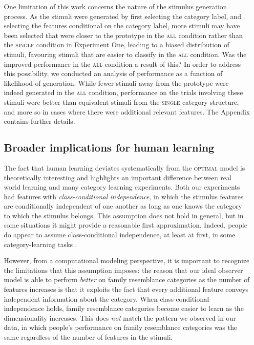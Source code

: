 \documentclass[a4paper, doc, floatsintext]{apa6}
\begin{document}
One limitation of this work concerns the nature of the stimulus generation process. As the stimuli were generated by first selecting the category label, and selecting the features conditional on the category label, more stimuli may have been selected that were closer to the prototype in the \textsc{all} condition rather than the \textsc{single} condition in Experiment One, leading to a biased distribution of stimuli, favouring stimuli that are easier to classify in the \textsc{all} condition. Was the improved performance in the \textsc{all} condition a result of this? In order to address this possibility, we conducted an analysis of performance as a function of likelihood of generation. While fewer stimuli away from the prototype were indeed generated in the \textsc{all} condition, performance on the trials involving these stimuli were better than equivalent stimuli from the \textsc{single} category structure, and more so in cases where there were additional relevant features. The Appendix contains further details.

\subsection{Broader implications for human learning}

The fact that human learning deviates systematically from the \textsc{optimal} model is theoretically interesting and highlights an important difference between real world learning and many category learning experiments. Both our experiments had features with \textit{class-conditional independence}, in which the stimulus features are conditionally independent of one another as long as one knows the category to which the stimulus belongs. This assumption does not hold in general, but in some situations it might provide a reasonable first approximation. Indeed, people do appear to assume class-conditional independence, at least at first, in some category-learning tasks \cite{jareckietalinpress}.

However, from a computational modeling perspective, it is important to recognize the limitations that this assumption imposes: the reason that our ideal observer model is able to perform \textit{better} on family resemblance categories as the number of features increases is that it exploits the fact that every additional feature conveys independent information about the category. When class-conditional independence holds, family resemblance categories become easier to learn as the dimensionality increases. This does \textit{not} match the pattern we observed in our data, in which people's performance on family resemblance categories was the same regardless of the number of features in the stimuli.
\end{document}
